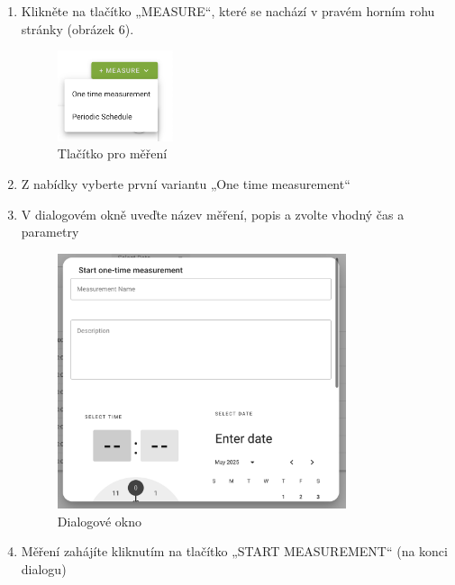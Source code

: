 \documentclass[12pt]{article}
\begin{document}
\begin{teamwork}
        \begin{enumerate}
            \item Klikněte na tlačítko „MEASURE“, které se nachází v pravém horním rohu stránky (obrázek 6).
            \begin{figure}[hbt!]
                \centering
                \includegraphics[width=0.32\textwidth]{../../img/measure_one_time_button}
                \caption{Tlačítko pro měření}
                \label{fig:measure_one_time}
            \end{figure}
            \item Z nabídky vyberte první variantu „One time measurement“
            \item V dialogovém okně uveďte název měření, popis a zvolte vhodný čas a parametry
            \begin{figure}[hbt!]
                  \centering
                  \includegraphics[width=0.8\textwidth]{../../img/one_time_measure_dialog}
                  \caption{Dialogové okno}
                  \label{fig:one_time_measure_dialog}
            \end{figure}
            \item Měření zahájíte kliknutím na tlačítko „START MEASUREMENT“ (na konci dialogu)
        \end{enumerate}


\end{teamwork}
\end{document}
